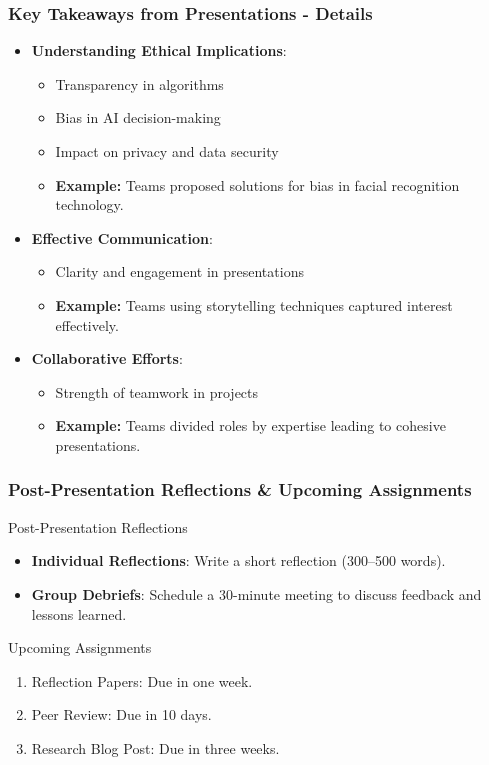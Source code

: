 \documentclass[aspectratio=169]{beamer}
\begin{document}
\begin{frame}[fragile]
    \frametitle{Key Takeaways from Presentations - Details}
    \begin{itemize}
        \item \textbf{Understanding Ethical Implications}:
            \begin{itemize}
                \item Transparency in algorithms
                \item Bias in AI decision-making
                \item Impact on privacy and data security
                \item \textbf{Example:} Teams proposed solutions for bias in facial recognition technology.
            \end{itemize}
            
        \item \textbf{Effective Communication}:
            \begin{itemize}
                \item Clarity and engagement in presentations
                \item \textbf{Example:} Teams using storytelling techniques captured interest effectively.
            \end{itemize}
        
        \item \textbf{Collaborative Efforts}:
            \begin{itemize}
                \item Strength of teamwork in projects
                \item \textbf{Example:} Teams divided roles by expertise leading to cohesive presentations.
            \end{itemize}
    \end{itemize}
\end{frame}

\begin{frame}[fragile]
    \frametitle{Post-Presentation Reflections & Upcoming Assignments}
    \begin{block}{Post-Presentation Reflections}
        \begin{itemize}
            \item \textbf{Individual Reflections}: Write a short reflection (300–500 words).
            \item \textbf{Group Debriefs}: Schedule a 30-minute meeting to discuss feedback and lessons learned.
        \end{itemize}
    \end{block}

    \begin{block}{Upcoming Assignments}
        \begin{enumerate}
            \item Reflection Papers: Due in one week.
            \item Peer Review: Due in 10 days.
            \item Research Blog Post: Due in three weeks.
        \end{enumerate}
    \end{block}
\end{frame}
\end{document}
